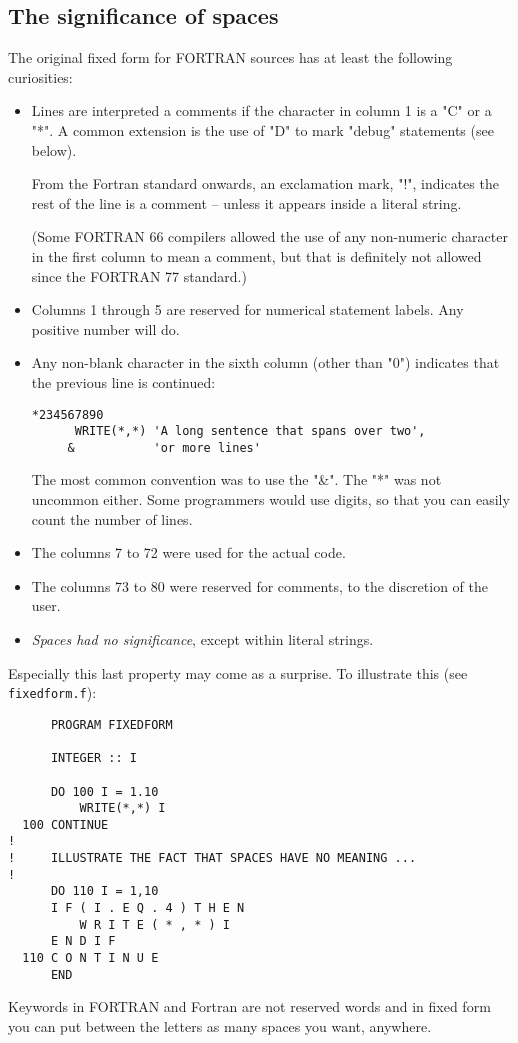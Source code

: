 \subsection{The significance of spaces}
The original fixed form for FORTRAN sources has at least the following curiosities:
\begin{itemize}
\item
Lines are interpreted a comments if the character in column 1 is a "C" or a "*".
A common extension is the use of "D" to mark "debug" statements (see below).

From the Fortran standard onwards, an exclamation mark, "!", indicates the rest of the line
is a comment -- unless it appears inside a literal string.

(Some FORTRAN 66 compilers allowed the use of any non-numeric character in the first column
to mean a comment, but that is definitely not allowed since the FORTRAN 77 standard.)
\item
Columns 1 through 5 are reserved for numerical statement labels. Any positive number will do.
\item
Any non-blank character in the sixth column (other than "0") indicates that the previous line is continued:
\begin{verbatim}
*234567890
      WRITE(*,*) 'A long sentence that spans over two',
     &           'or more lines'
\end{verbatim}
The most common convention was to use the "\&". The "*" was not uncommon either.
Some programmers would use digits, so that you can easily count the number of lines.
\item
The columns 7 to 72 were used for the actual code.
\item
The columns 73 to 80 were reserved for comments, to the discretion of the user.
\item
\emph{Spaces had no significance}, except within literal strings.
\end{itemize}

Especially this last property may come as a surprise. To illustrate this (see \verb+fixedform.f+):
\begin{verbatim}
      PROGRAM FIXEDFORM

      INTEGER :: I

      DO 100 I = 1.10
          WRITE(*,*) I
  100 CONTINUE
!
!     ILLUSTRATE THE FACT THAT SPACES HAVE NO MEANING ...
!
      DO 110 I = 1,10
      I F ( I . E Q . 4 ) T H E N
          W R I T E ( * , * ) I
      E N D I F
  110 C O N T I N U E
      END
\end{verbatim}
Keywords in FORTRAN and Fortran are not reserved words and in fixed form you can
put between the letters as many spaces you want, anywhere.

